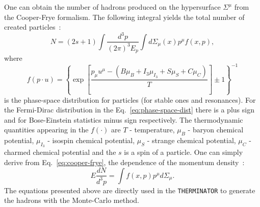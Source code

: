      One can obtain the number of hadrons produced on the hypersurface $\Sigma^{\mu}$ from the Cooper-Frye formalism.
      The following integral yields the total number of created particles~\cite{therminator2}:
      \begin{equation}
        \label{eq:cooper-frye}
        N = (2s+1) \int \frac{d^3p}{(2\pi)^3 E_p} \int d\Sigma_{\mu}(x)p^\mu f(x,p) ,
      \end{equation}
      where
      \begin{equation}
        \label{eq:phase-space-dist}
        f(p \cdot u) = \left\{ \exp\left[ \frac{p_\mu u^\mu - (B \mu_B + I_3 \mu_{I_3}+S\mu_S + C \mu_C)}{T} \right] \pm 1 \right\}^{-1}
      \end{equation}
      is the phase-space distribution for particles (for stable ones and resonances).
      For the Fermi-Dirac distribution in the Eq.~\ref{eq:phase-space-dist} there is a plus sign and for Bose-Einstein statistics minus sign respectively.
      The thermodynamic quantities appearing in the $f(\cdot)$ are $T$ - temperature, $\mu_B$ - baryon chemical potential, $\mu_{I_3}$ - isospin chemical potential, $\mu_S$ - strange chemical potential, $\mu_C$ - charmed chemical potential and the $s$ is a spin of a particle.
      One can simply derive from Eq.~\ref{eq:cooper-frye}, the dependence of the momentum density~\cite{cooperfrye}:
      \begin{equation}
        E \frac{d N}{d^3 p} = \int f(x,p)p^\mu d \Sigma_\mu .
      \end{equation}
      The equations presented above are directly used in the \verb|THERMINATOR| to generate the hadrons with the Monte-Carlo method.
